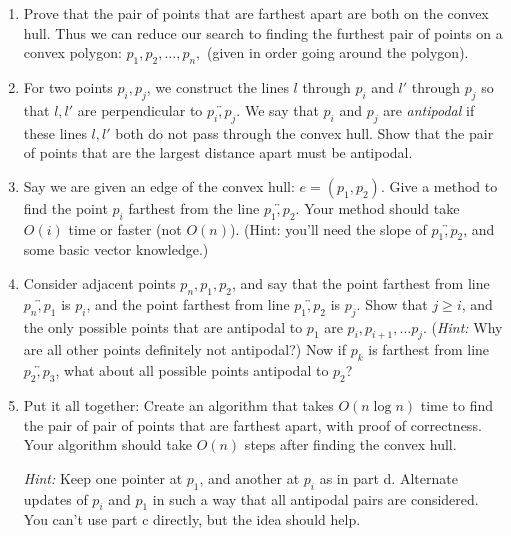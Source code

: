 \documentclass{article}
\begin{document}
\begin{enumerate}
    \item Prove that the pair of points that are farthest apart are both on the convex hull. Thus we can reduce our search to finding the furthest pair of points on a convex polygon:  $p_1,p_2,\ldots, p_n,$  (given in order going around the polygon). 
    \item For two points $p_i,p_j$, we construct the lines $l$ through $p_i$ and $l'$ through $p_j$ so that $l,l'$ are perpendicular to $\overleftrightarrow{p_i,p_j}$. We say that $p_i$ and $p_j$ are \emph{antipodal} if these lines $l,l'$ both do not pass through the convex hull. Show that the pair of points that are the largest distance apart must be antipodal.
    \item Say we are given an edge of the convex hull: $e = (p_1, p_2)$. Give a method to find the point $p_i$ farthest from the line $\overleftrightarrow{p_1,p_2}$. Your method should take $O(i)$ time or faster (not $O(n)$).  (Hint: you'll need the slope of $\overleftrightarrow{p_1,p_2}$, and some basic vector knowledge.)
    \item  Consider adjacent points $p_n,p_1,p_2$, and say that the point farthest from line $\overleftrightarrow{p_n,p_1}$ is $p_i$, and the point farthest from line $\overleftrightarrow{p_1,p_2}$ is $p_j$. Show that $j \geq i$, and the only possible points that are antipodal to $p_1$ are $p_i, p_{i+1}, \ldots p_j$. (\textit{Hint:} Why are all other points definitely not antipodal?) Now if $p_k$ is farthest from line $\overleftrightarrow{p_2,p_3}$, what about all possible points antipodal to $p_2$?
    \item  Put it all together: Create an algorithm that takes $O(n \log n)$ time to find the pair of pair of points that are farthest apart, with proof of correctness.  Your algorithm should take $O(n)$ steps after finding the convex hull.
    
    \vspace{3mm}\textit{Hint:} Keep one pointer at $p_1$, and another at $p_i$ as in part d. Alternate updates of $p_i$ and $p_1$ in such a way that all antipodal pairs are considered.  You can't use part c directly, but the idea should help.
\end{enumerate}
\end{document}
